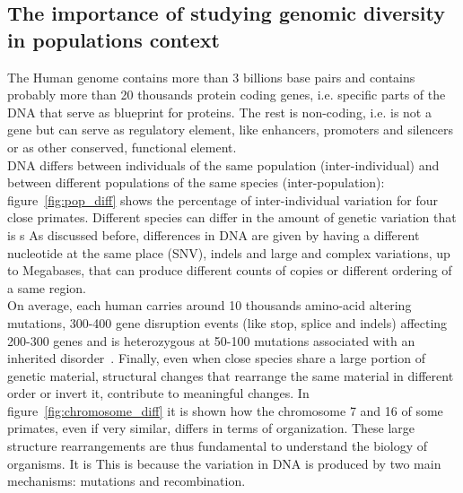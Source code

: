 \subsection{The importance of studying genomic diversity in populations context}
The Human genome contains more than 3 billions base pairs and contains probably more than 20 thousands protein coding genes, i.e. specific parts of the DNA that serve as blueprint for proteins. The rest is non-coding, i.e. is not a gene but can serve as regulatory element, like enhancers, promoters and silencers or as other conserved, functional element.\\
DNA differs between individuals of the same population (inter-individual) and between different populations of the same species (inter-population): figure~\ref{fig:pop_diff} shows the percentage of inter-individual variation for four close primates. Different species can differ in the amount of genetic variation that is s As discussed before, differences in DNA are given by having a different nucleotide at the same place (SNV), indels and large and complex variations, up to Megabases, that can produce different counts of copies or different ordering of a same region. \\
On average, each human carries around 10 thousands amino-acid altering mutations, 300-400 gene disruption events (like stop, splice and indels) affecting 200-300 genes and is heterozygous at 50-100 mutations associated with an inherited disorder~\cite{genome_diversity_quintana}. 
Finally, even when close species share a large portion of genetic material, structural changes that rearrange the same material in different order or invert it, contribute to meaningful changes. In figure~\ref{fig:chromosome_diff} it is shown how the chromosome 7 and 16 of some primates, even if very similar, differs in terms of organization. These large structure rearrangements are thus fundamental to understand the biology of organisms.
It is 
This is because the variation in DNA is produced by two main mechanisms: mutations and recombination. 

